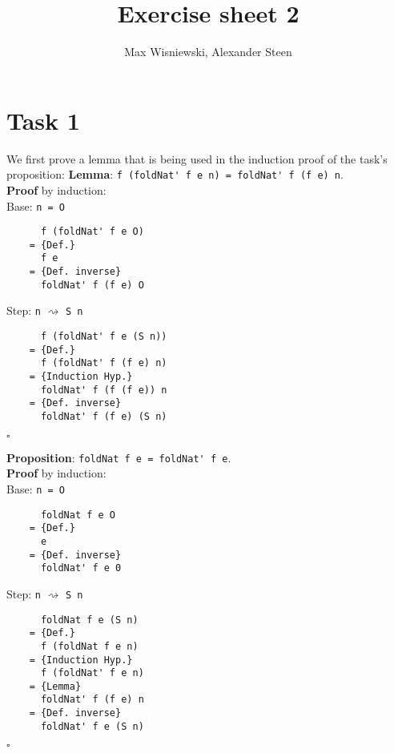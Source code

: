 \documentclass[11pt,a4paper,ngerman]{article}
\date{}
\title{Exercise sheet 2}
\author{Max Wisniewski, Alexander Steen}
\begin{document}
\renewcommand{\figurename}{Figure}
\maketitle
\thispagestyle{fancy}

\section*{Task 1}
We first prove a lemma that is being used in the induction proof of the task's proposition:
\textbf{Lemma}: \lstinline|f (foldNat' f e n) = foldNat' f (f e) n|.\\
\textbf{Proof} by induction:\\
Base: \texttt{n = O}
    \begin{lstlisting}
      f (foldNat' f e O)
    = {Def.}
      f e
    = {Def. inverse}
      foldNat' f (f e) O
    \end{lstlisting}
Step: \texttt{n} $\rightsquigarrow$ \texttt{S n}
    \begin{lstlisting}
      f (foldNat' f e (S n))
    = {Def.}
      f (foldNat' f (f e) n)
    = {Induction Hyp.}
      foldNat' f (f (f e)) n
    = {Def. inverse}
      foldNat' f (f e) (S n)
    \end{lstlisting}
\mbox{} \hfill $\square$

\textbf{Proposition}: \lstinline|foldNat f e = foldNat' f e|.\\
\textbf{Proof} by induction:\\
Base: \texttt{n = O}
    \begin{lstlisting}
      foldNat f e O
    = {Def.}
      e
    = {Def. inverse}
      foldNat' f e 0
    \end{lstlisting}
Step: \texttt{n} $\rightsquigarrow$ \texttt{S n}
    \begin{lstlisting}
      foldNat f e (S n)
    = {Def.}
      f (foldNat f e n)
    = {Induction Hyp.}
      f (foldNat' f e n)
    = {Lemma}
      foldNat' f (f e) n
    = {Def. inverse}
      foldNat' f e (S n)
    \end{lstlisting} 
\mbox{} \hfill $\square$


\label{LastPage}
\end{document}
